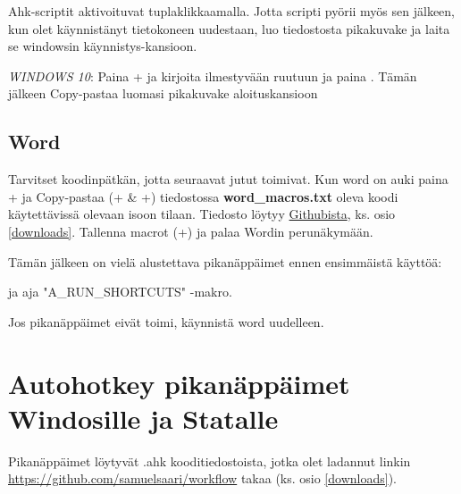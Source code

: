 \documentclass[a4paper,12pt]{scrartcl}
\newcommand*{\mybox}[1]{\framebox{#1}}
\begin{document}
\medskip

Ahk-scriptit aktivoituvat tuplaklikkaamalla. Jotta scripti pyörii myös sen jälkeen, kun olet käynnistänyt tietokoneen uudestaan, luo tiedostosta pikakuvake ja laita se windowsin käynnistys-kansioon.

\medskip

\emph{WINDOWS 10}: Paina + ja kirjoita ilmestyvään ruutuun \mybox{shell::startup} ja paina \keys{\return}. Tämän jälkeen Copy-pastaa luomasi pikakuvake aloituskansioon

\medskip





\subsection{Word}
Tarvitset koodinpätkän, jotta seuraavat jutut toimivat. Kun word on auki paina + ja Copy-pastaa (+ \& +) tiedostossa \textbf{word\_macros.txt} oleva koodi käytettävissä olevaan isoon tilaan. Tiedosto löytyy \href{https://github.com/samuelsaari/workflow}{Githubista}, ks. osio \ref{downloads}. Tallenna macrot (+) ja palaa Wordin perunäkymään.

Tämän jälkeen on vielä alustettava pikanäppäimet ennen ensimmäistä käyttöä:


 ja aja "A\_RUN\_SHORTCUTS" -makro.

Jos pikanäppäimet eivät toimi, käynnistä word uudelleen. 



\section{Autohotkey pikanäppäimet Windosille ja Statalle}
Pikanäppäimet löytyvät \*.ahk kooditiedostoista, jotka olet ladannut linkin \url{https://github.com/samuelsaari/workflow} takaa (ks. osio \ref{downloads}).
\end{document}
